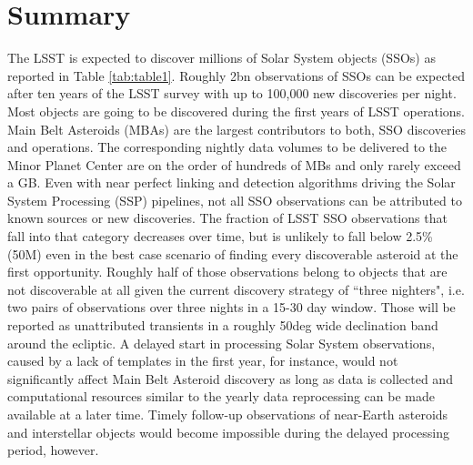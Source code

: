 \section{Summary} \label{sec:abstract}

The \gls{LSST} is expected to discover millions of Solar System objects (SSOs) as reported in Table \ref{tab:table1}.
Roughly 2bn observations of SSOs can be expected after ten years of the \gls{LSST} survey with up to 100,000 new discoveries per night. Most objects are going to be discovered during the first years of \gls{LSST} operations. Main Belt Asteroids (MBAs) are the largest contributors to both, \gls{SSO} discoveries and operations.
The corresponding nightly data volumes to be delivered to the Minor Planet \gls{Center} are on the order of hundreds of MBs and only rarely exceed a \gls{GB}.
Even with near perfect linking and detection algorithms driving the Solar System Processing (\gls{SSP}) pipelines, not all \gls{SSO} observations can be attributed to known sources or new discoveries.
The fraction of \gls{LSST} \gls{SSO} observations that fall into that category decreases over time, but is unlikely to fall below 2.5\% (50M) even in the best case scenario of finding every discoverable asteroid at the first opportunity. Roughly half of those observations belong to objects that are not discoverable at all given the current discovery strategy of ``three nighters", i.e. two pairs of observations over three nights in a 15-30 day window. Those will be reported as unattributed transients in a roughly 50deg wide \gls{declination} band around the ecliptic. A delayed start in processing Solar System observations, caused by a lack of templates in the first year, for instance, would not significantly affect Main Belt Asteroid discovery as long as data is collected and computational resources similar to the yearly data reprocessing can be made available at a later time. Timely follow-up observations of near-Earth asteroids and interstellar objects would become impossible during the delayed processing period, however.

